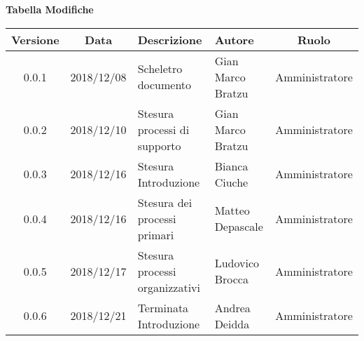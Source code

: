 \begin{center}
	\textbf{Tabella Modifiche}
	\end{center}
	\begin{center}
		\begin{tabularx}{\textwidth}{|c|c|X|X|c|}
			\hline
			\textbf{Versione} & \textbf{Data} & \textbf{Descrizione} & \textbf{Autore} & \textbf{Ruolo} \\
			\hline
			0.0.1 & 2018/12/08 & Scheletro documento  & Gian Marco Bratzu & Amministratore\\
			\hline
			0.0.2 & 2018/12/10 & Stesura processi di supporto & Gian Marco Bratzu & Amministratore\\	
			\hline
			0.0.3 & 2018/12/16 & Stesura Introduzione & Bianca Ciuche & Amministratore\\
			\hline
			0.0.4 & 2018/12/16 & Stesura dei processi primari & Matteo Depascale & Amministratore\\
			\hline
			0.0.5 & 2018/12/17 & Stesura processi organizzativi & Ludovico Brocca & Amministratore\\
			\hline
			0.0.6 & 2018/12/21 & Terminata Introduzione & Andrea Deidda & Amministratore\\
			\hline
		\end{tabularx}
	\end{center}

\newpage